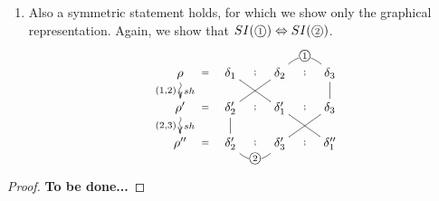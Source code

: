 \documentclass{llncs}
\newcommand{\cycl}[1]{\ensuremath{\mbox{\textcircled{\scriptsize{$#1$}}}}}
\renewcommand{\iff}{\ensuremath{\Leftrightarrow}}
\newcommand{\shiftdir}[1][]{\ensuremath{\mathrel{{\rightsquigarrow}^{\mathit{sh}}_{#1}}}}
\begin{document}
\begin{lemma}
\begin{enumerate}
\item  Also a symmetric statement holds, for which we show only the graphical representation. Again, we show that $SI(\cycl{1}) \iff SI(\cycl{2})$.



$$\xymatrix@C=2pc@R=1pc{
 \rho  \ar@{~>}[d]^{sh}_{(1,2)}  \ar@{}[r]|{=} &
   \delta_1 \ar@{-}[dr]  \ar@{}[r]|{;}  &
    \delta_2 \ar@{-}[dl]  \ar@{}[r]|{;} \ar@{-}@/^3ex/[r]|{\cycl{1}} &
    \delta_3 \ar@{-}[d] \\
\rho'  \ar@{~>}[d]^{sh}_{(2,3)}  \ar@{}[r]|{=} &
   \delta'_2 \ar@{-}[d]  \ar@{}[r]|{;} &
    \delta'_1 \ar@{-}[dr]  \ar@{}[r]|{;} &
     \delta_3 \ar@{-}[dl]\\
\rho''  \ar@{}[r]|{=} & 
   \delta'_2 \ar@{}[r]|{;} \ar@{-}@/_3ex/[r]|{\cycl{2}} &
    \delta'_3  \ar@{}[r]|{;} &
     \delta''_1  \\
}$$


%
\end{enumerate}
%
\end{lemma}
\begin{proof}
\textbf{To be done...}

\end{proof}
\end{document}
